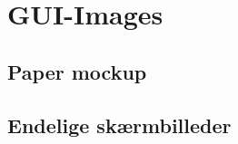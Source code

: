 \chapter{GUI-Images}
\label{App_GUI}

\section{Paper mockup}
\label{App_GUI_paper}

\section{Endelige skærmbilleder}
\label{App_GUI_final}